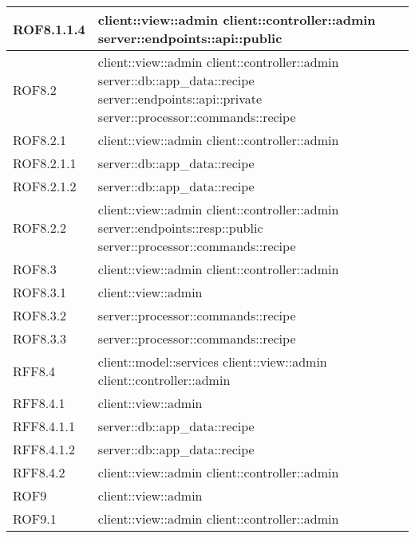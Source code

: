\begin{center}
\begin{longtable}{| p{4cm} | p{8cm} |}
\hline
ROF8.1.1.4 & client::view::admin \newline client::controller::admin \newline server::endpoints::api::public \\
\hline
ROF8.2 & client::view::admin \newline client::controller::admin \newline server::db::app\_data::recipe \newline server::endpoints::api::private \newline server::processor::commands::recipe \\
\hline
ROF8.2.1 & client::view::admin \newline client::controller::admin \\
\hline
ROF8.2.1.1 & server::db::app\_data::recipe \\
\hline
ROF8.2.1.2 & server::db::app\_data::recipe \\
\hline
ROF8.2.2 & client::view::admin \newline client::controller::admin \newline server::endpoints::resp::public \newline server::processor::commands::recipe \\
\hline
ROF8.3 & client::view::admin \newline client::controller::admin \\
\hline
ROF8.3.1 & client::view::admin \\
\hline
ROF8.3.2 & server::processor::commands::recipe \\
\hline
ROF8.3.3 & server::processor::commands::recipe \\
\hline
RFF8.4 & client::model::services \newline client::view::admin \newline client::controller::admin \\
\hline
RFF8.4.1 & client::view::admin \\
\hline
RFF8.4.1.1 & server::db::app\_data::recipe \\
\hline
RFF8.4.1.2 & server::db::app\_data::recipe \\
\hline
RFF8.4.2 & client::view::admin \newline client::controller::admin \\
\hline
ROF9 & client::view::admin \\
\hline
ROF9.1 & client::view::admin \newline client::controller::admin \\

\end{longtable}
\end{center}
